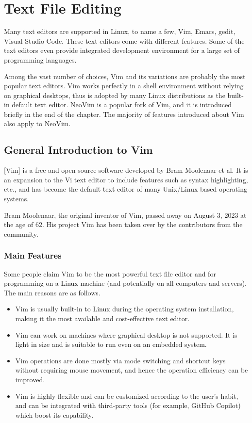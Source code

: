 \chapter{Text File Editing} \label{ch:tfe}

Many text editors are supported in Linux, to name a few, Vim, Emacs, gedit, Visual Studio Code. These text editors come with different features. Some of the text editors even provide integrated development environment for a large set of programming languages.

Among the vast number of choices, Vim and its variations are probably the most popular text editors. Vim works perfectly in a shell environment without relying on graphical desktops, thus is adopted by many Linux distributions as the built-in default text editor. NeoVim is a popular fork of Vim, and it is introduced briefly in the end of the chapter. The majority of features introduced about Vim also apply to NeoVim.

\section{General Introduction to Vim}

[Vim] is a free and open-source software developed by Bram Moolenaar et al. It is an expansion to the Vi text editor to include features such as syntax highlighting, etc., and has become the default text editor of many Unix/Linux based operating systems.

Bram Moolenaar, the original inventor of Vim, passed away on August 3, 2023 at the age of 62. His project Vim has been taken over by the contributors from the community. 

\subsection{Main Features}

Some people claim Vim to be the most powerful text file editor and  for programming on a Linux machine (and potentially on all computers and servers). The main reasons are as follows.
\begin{itemize}
  \item Vim is usually built-in to Linux during the operating system installation, making it the most available and cost-effective text editor.
  \item Vim can work on machines where graphical desktop is not supported. It is light in size and is suitable to run even on an embedded system.
  \item Vim operations are done mostly via mode switching and shortcut keys without requiring mouse movement, and hence the operation efficiency can be improved.
  \item Vim is highly flexible and can be customized according to the user's habit, and can be integrated with third-party tools (for example, GitHub Copilot) which boost its capability.
\end{itemize}

